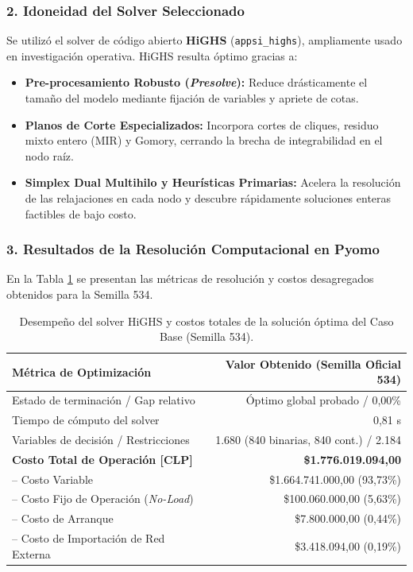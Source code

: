 \documentclass[10pt,letterpaper]{article}
\begin{document}
\subsubsection*{2. Idoneidad del Solver Seleccionado}
Se utilizó el solver de código abierto \textbf{HiGHS} (\texttt{appsi\_highs}), ampliamente usado en investigación operativa. HiGHS resulta óptimo gracias a:
\begin{itemize}
    \item \textbf{Pre-procesamiento Robusto (\textit{Presolve}):} Reduce drásticamente el tamaño del modelo mediante fijación de variables y apriete de cotas.
    \item \textbf{Planos de Corte Especializados:} Incorpora cortes de cliques, residuo mixto entero (MIR) y Gomory, cerrando la brecha de integrabilidad en el nodo raíz.
    \item \textbf{Simplex Dual Multihilo y Heurísticas Primarias:} Acelera la resolución de las relajaciones en cada nodo y descubre rápidamente soluciones enteras factibles de bajo costo.
\end{itemize}

\subsubsection*{3. Resultados de la Resolución Computacional en Pyomo}
En la Tabla \ref{tab:desempeno_solver} se presentan las métricas de resolución y costos desagregados obtenidos para la Semilla 534.

\begin{table}[H]
\centering
\caption{Desempeño del solver HiGHS y costos totales de la solución óptima del Caso Base (Semilla 534).}
\label{tab:desempeno_solver}
\setlength{\tabcolsep}{4pt}
\small
\begin{tabular}{lr}
\toprule
\textbf{Métrica de Optimización} & \textbf{Valor Obtenido (Semilla Oficial 534)} \\
\midrule
Estado de terminación / Gap relativo & Óptimo global probado / 0,00\% \\
Tiempo de cómputo del solver & 0,81 s \\
Variables de decisión / Restricciones & 1.680 (840 binarias, 840 cont.) / 2.184 \\
\midrule
\textbf{Costo Total de Operación [CLP]} & \textbf{\$1.776.019.094,00} \\
-- Costo Variable & \$1.664.741.000,00 (93,73\%) \\
-- Costo Fijo de Operación (\textit{No-Load}) & \$100.060.000,00 (5,63\%) \\
-- Costo de Arranque  & \$7.800.000,00 (0,44\%) \\
-- Costo de Importación de Red Externa & \$3.418.094,00 (0,19\%) \\
\bottomrule
\end{tabular}
\end{table}
\end{document}
